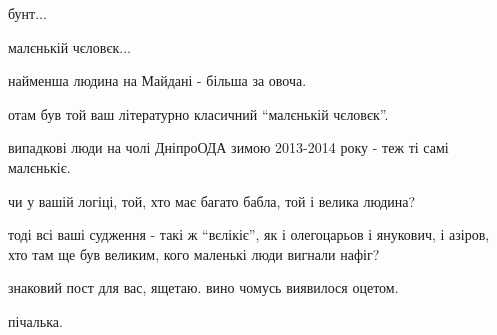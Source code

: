 \begin{itemize}
бунт...

малєнькій чєловєк...

найменша людина на Майдані - більша за овоча.

отам був той ваш літературно класичний \enquote{малєнькій чєловєк}.

випадкові люди на чолі ДніпроОДА зимою 2013-2014 року - теж ті самі малєнькіє.

чи у вашій логіці, той, хто має багато бабла, той і велика людина?

тоді всі ваші судження - такі ж \enquote{вєлікіє}, як і олегоцарьов і янукович, і
азіров, хто там ще був великим, кого маленькі люди вигнали нафіг?

знаковий пост для вас, ящетаю. вино чомусь виявилося оцетом.

пічалька.


\end{itemize} %
